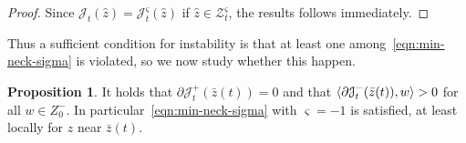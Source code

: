 \documentclass[a4paper,10pt,oneside]{amsbook}
\numberwithin{section}{chapter}
\numberwithin{equation}{chapter}
\theoremstyle{definition}
\newtheorem{prop}{Proposition}[chapter]
\DeclarePairedDelimiter{\dual}{\langle}{\rangle}
\begin{document}
\begin{proof}
Since $\mathcal{J}_t(\hat z)=\mathcal{J}_t^\varsigma(\hat z)$ if $\hat z\in\mathscr{Z}^\varsigma_t$, the results follows immediately.
\end{proof}
Thus a sufficient condition for instability is that at least one among~\eqref{eqn:min-neck-sigma} is violated, so we now study whether this happen.
\begin{prop}
It holds that $\partial\mathcal{J}^+_t(\bar z(t))=0$ and that $\dual{\partial\mathcal{J}^-_t(\bar z(t)),w}>0$ for all $w\in Z_0^-$. In particular~\eqref{eqn:min-neck-sigma} with $\varsigma=-1$ is satisfied, at least locally for $z$ near $\bar z(t)$.
\end{prop}
\end{document}
